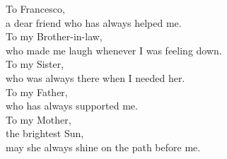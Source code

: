 \documentclass[11pt,a4paper,oneside,
openright]{book}
\begin{document}
\begin{dedication}

  To Francesco,\\
  a dear friend who has always helped me.\\
  To my Brother-in-law,\\
  who made me laugh whenever I was feeling down.\\
  To my Sister,\\
  who was always there when I needed her.\\
  To my Father,\\
  who has always supported me.\\
  To my Mother,\\
  the brightest Sun, \\
  may she always shine on the path before me.
  
\end{dedication}

\tableofcontents
\listoffigures
\listoftables
\lstlistoflistings







\printbibliography[heading=bibintoc]
\end{document}
